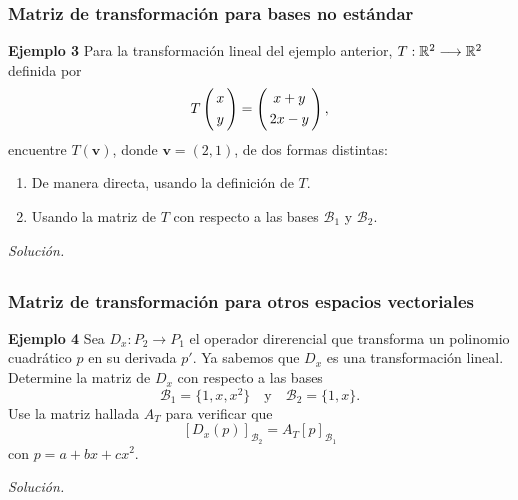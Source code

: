 \begin{frame}\frametitle{Matriz de transformación para bases no estándar}

\begin{ej}{\textbf{Ejemplo 3 }}
	\justifying
	Para la transformación lineal del ejemplo anterior, $T:\mathbb{R}^2\longrightarrow\mathbb{R}^2$ definida por 
	\[
	T
	\left(
	\begin{array}{@{\hspace{0.3\tabcolsep}}c@{\hspace{0.3\tabcolsep}}}
	x  \\[1mm]
	y  
	\end{array}
	\right)
	=
	\left(
	\begin{array}{@{\hspace{0.3\tabcolsep}}c@{\hspace{0.3\tabcolsep}}}
	x+y  \\[1mm]
	2x-y 
	\end{array}
	\right),
	\]
	encuentre $T(\mathbf{v})$, donde $\mathbf{v}=(2,1)$, de dos formas distintas:
	\begin{enumerate}[1.]
		\justifying
		\item[\labelname{$a$}] De manera directa, usando la definición de $T$.
		\item[\labelname{$b$}] Usando la matriz de $T$ con respecto a las bases $\mathcal{B}_1$ y $\mathcal{B}_2$.
	\end{enumerate}
	
	
\end{ej}
\textit{Solución.}

\end{frame}


\subsection{}

\begin{frame}\frametitle{Matriz de transformación para otros espacios vectoriales}

\begin{ej}{\textbf{Ejemplo 4 }}
	\justifying
	Sea $D_x:P_2\longrightarrow P_1$ el operador direrencial que transforma un polinomio cuadrático $p$ en su derivada $p'$. Ya sabemos que $D_x$ es una transformación lineal. Determine la matriz de $D_x$ con respecto a las bases
	\[
	\mathcal{B}_1=\{1,x,x^2\} \quad\text{y}\quad \mathcal{B}_2=\{1,x\}.
	\]
	Use la matriz hallada $A_T$ para verificar que $$\left[D_x(p)\right]_{\mathcal{B}_2}=A_T\left[p\right]_{\mathcal{B}_1}$$ con $p=a+bx+cx^2$.
	
\end{ej}
\textit{Solución.}

\end{frame}

